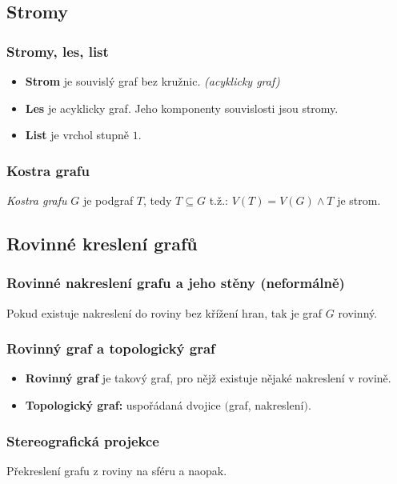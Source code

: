 \documentclass[10pt,a4paper]{article}
\begin{document}
\subsection{Stromy}

\subsubsection{Stromy, les, list}
\begin{itemize}
    \item \textbf{Strom} je souvislý graf bez kružnic. \textit{(acyklicky graf)}
    \item \textbf{Les} je acyklicky graf. Jeho komponenty souvislosti jsou stromy.
    \item \textbf{List} je vrchol stupně $1$.
\end{itemize}

\subsubsection{Kostra grafu}
\textit{Kostra grafu} $G$ je podgraf $T$, tedy $T \subseteq G$ t.ž.: $V(T) = V(G) \land T$ je strom.


\subsection{Rovinné kreslení grafů}

\subsubsection{Rovinné nakreslení grafu a jeho stěny (neformálně)}
Pokud existuje nakreslení do roviny bez křížení hran, tak je graf $G$ rovinný.

\subsubsection{Rovinný graf a topologický graf}
\begin{itemize}
    \item \textbf{Rovinný graf} je takový graf, pro nějž existuje nějaké nakreslení v rovině.
    \item \textbf{Topologický graf:} uspořádaná dvojice $($graf, nakreslení$)$.
\end{itemize}

\subsubsection{Stereografická projekce}
Překreslení grafu z roviny na sféru a naopak.
\end{document}
